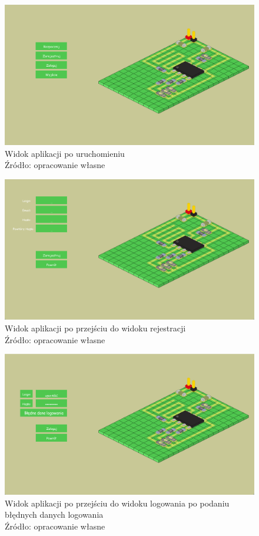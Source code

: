\documentclass[12pt, a4paper]{article} %
\begin{document}
\begin{figure}[h]
	\centering
	\includegraphics[width=15cm]{images/uruchomienie/app_start_menu.png}
	\caption{Widok aplikacji po uruchomieniu \\ Źródło: opracowanie własne}
	\label{rys:start_menu}
\end{figure} 

\begin{figure}[h]
	\centering
	\includegraphics[width=15cm]{images/uruchomienie/app_register_menu.png}
	\caption{Widok aplikacji po przejściu do widoku rejestracji \\ Źródło: opracowanie własne}
	\label{rys:register_menu}
\end{figure} 

\begin{figure}[h]
	\centering
	\includegraphics[width=15cm]{images/uruchomienie/app_login_menu.png}
	\caption{Widok aplikacji po przejściu do widoku logowania po podaniu błędnych danych logowania  \\ Źródło: opracowanie własne}
	\label{rys:login_menu}
\end{figure} 
\end{document}
